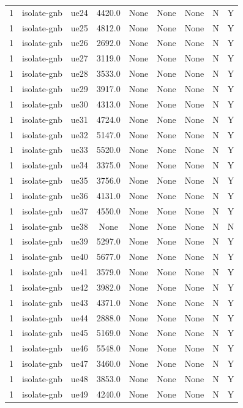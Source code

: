 \begin{table}[ht]
\begin{tabular}{|c|c|c|c|c|c|c|c|c|}
1 & isolate-gnb & ue24 & 4420.0 & None & None & None & N & Y \\
1 & isolate-gnb & ue25 & 4812.0 & None & None & None & N & Y \\
1 & isolate-gnb & ue26 & 2692.0 & None & None & None & N & Y \\
1 & isolate-gnb & ue27 & 3119.0 & None & None & None & N & Y \\
1 & isolate-gnb & ue28 & 3533.0 & None & None & None & N & Y \\
1 & isolate-gnb & ue29 & 3917.0 & None & None & None & N & Y \\
1 & isolate-gnb & ue30 & 4313.0 & None & None & None & N & Y \\
1 & isolate-gnb & ue31 & 4724.0 & None & None & None & N & Y \\
1 & isolate-gnb & ue32 & 5147.0 & None & None & None & N & Y \\
1 & isolate-gnb & ue33 & 5520.0 & None & None & None & N & Y \\
1 & isolate-gnb & ue34 & 3375.0 & None & None & None & N & Y \\
1 & isolate-gnb & ue35 & 3756.0 & None & None & None & N & Y \\
1 & isolate-gnb & ue36 & 4131.0 & None & None & None & N & Y \\
1 & isolate-gnb & ue37 & 4550.0 & None & None & None & N & Y \\
1 & isolate-gnb & ue38 & None & None & None & None & N & N \\
1 & isolate-gnb & ue39 & 5297.0 & None & None & None & N & Y \\
1 & isolate-gnb & ue40 & 5677.0 & None & None & None & N & Y \\
1 & isolate-gnb & ue41 & 3579.0 & None & None & None & N & Y \\
1 & isolate-gnb & ue42 & 3982.0 & None & None & None & N & Y \\
1 & isolate-gnb & ue43 & 4371.0 & None & None & None & N & Y \\
1 & isolate-gnb & ue44 & 2888.0 & None & None & None & N & Y \\
1 & isolate-gnb & ue45 & 5169.0 & None & None & None & N & Y \\
1 & isolate-gnb & ue46 & 5548.0 & None & None & None & N & Y \\
1 & isolate-gnb & ue47 & 3460.0 & None & None & None & N & Y \\
1 & isolate-gnb & ue48 & 3853.0 & None & None & None & N & Y \\
1 & isolate-gnb & ue49 & 4240.0 & None & None & None & N & Y \\

\end{tabular}
\end{table}
